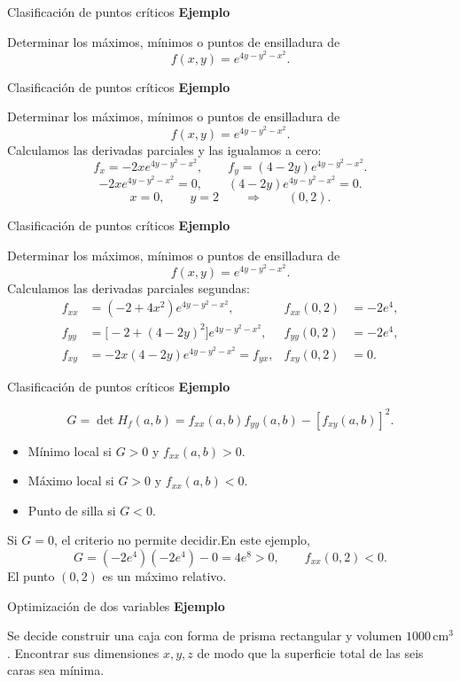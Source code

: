 \documentclass[original_version/main.tex]{subfiles}
\begin{document}
\begin{frame}{Clasificación de puntos críticos}
\textbf{Ejemplo}\par Determinar los máximos, mínimos o puntos de ensilladura de\[f(x,y)=e^{4y-y^2-x^2}.\]
\end{frame}
\begin{frame}{Clasificación de puntos críticos}
\small\textbf{Ejemplo}\par Determinar los máximos, mínimos o puntos de ensilladura de\[f(x,y)=e^{4y-y^2-x^2}.\]Calculamos las derivadas parciales y las igualamos a cero:
\[f_x=-2xe^{4y-y^2-x^2},\qquad f_y=(4-2y)e^{4y-y^2-x^2}.\]
\[-2xe^{4y-y^2-x^2}=0,\qquad(4-2y)e^{4y-y^2-x^2}=0.\]
\[x=0,\qquad y=2\qquad\Longrightarrow\qquad(0,2).\]
\end{frame}
\begin{frame}{Clasificación de puntos críticos}
\small\textbf{Ejemplo}\par Determinar los máximos, mínimos o puntos de ensilladura de\[f(x,y)=e^{4y-y^2-x^2}.\]Calculamos las derivadas parciales segundas:
\[\begin{aligned}
f_{xx}&=(-2+4x^2)e^{4y-y^2-x^2},&f_{xx}(0,2)&=-2e^4,\\
f_{yy}&=\bigl[-2+(4-2y)^2\bigr]e^{4y-y^2-x^2},&f_{yy}(0,2)&=-2e^4,\\
f_{xy}&=-2x(4-2y)e^{4y-y^2-x^2}=f_{yx},&f_{xy}(0,2)&=0.
\end{aligned}\]
\end{frame}
\begin{frame}{Clasificación de puntos críticos}
\small\textbf{Ejemplo}\par\[G=\det H_f(a,b)=f_{xx}(a,b)f_{yy}(a,b)-[f_{xy}(a,b)]^2.\]
\begin{itemize}
\item Mínimo local si $G>0$ y $f_{xx}(a,b)>0$.
\item Máximo local si $G>0$ y $f_{xx}(a,b)<0$.
\item Punto de silla si $G<0$.
\end{itemize}
Si $G=0$, el criterio no permite decidir.\medskip En este ejemplo,
\[G=(-2e^4)(-2e^4)-0=4e^8>0,\qquad f_{xx}(0,2)<0.\]
El punto $(0,2)$ es un máximo relativo.
\end{frame}
\begin{frame}{Optimización de dos variables}
\textbf{Ejemplo}\par Se decide construir una caja con forma de prisma rectangular y volumen $1000\,\mathrm{cm}^3$. Encontrar sus dimensiones $x,y,z$ de modo que la superficie total de las seis caras sea mínima.
\end{frame}
\end{document}
